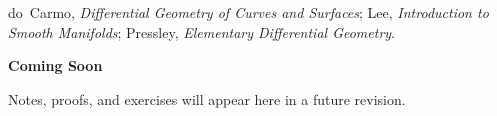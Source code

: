 \begin{remark*}
do~Carmo, \textit{Differential Geometry of Curves and Surfaces};
Lee, \textit{Introduction to Smooth Manifolds};
Pressley, \textit{Elementary Differential Geometry}.
\end{remark*}

\vspace{1em}
\begin{tcolorbox}[
  colback=gray!6, colframe=gray!40, arc=2pt,
  left=8pt, right=8pt, top=6pt, bottom=6pt,
  title={\small\textbf{Status: Planned}},
  fonttitle=\small\bfseries
]
\begin{center}\Large\bfseries Coming Soon\end{center}
\vspace{6pt}
\noindent Notes, proofs, and exercises will appear here in a future revision.
\end{tcolorbox}

% 
% 
% 
% 
% 
% 
% 
% 
% 
